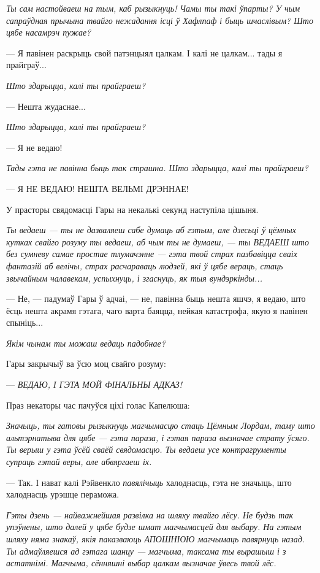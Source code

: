 \emph{Ты сам настойваеш на тым, каб рызыкнуць! Чамы ты такі ўпарты? У чым 
сапраўдная прычына твайго нежадання ісці ў Хафлпаф і быць шчаслівым? Што цябе 
насамрэч пужае?}

--- Я павінен раскрыць свой патэнцыял цалкам. І калі не цалкам... тады 
я прайграў...

\emph{Што здарыцца, калі ты прайграеш?}

--- Нешта жудаснае...

\emph{Што здарыцца, калі ты прайграеш?}

--- Я не ведаю!

\emph{Тады гэта не павінна быць так страшна. Што здарыцца, калі ты прайграеш?}

--- Я НЕ ВЕДАЮ! НЕШТА ВЕЛЬМІ ДРЭННАЕ!

У прасторы свядомасці Гары на некалькі секунд наступіла цішыня. 

\emph{Ты ведаеш --- ты не дазваляеш сабе думаць аб гэтым, але дзесьці ў цёмных 
кутках свайго розуму ты ведаеш, аб чым ты не думаеш, --- ты ВЕДАЕШ што без сумневу
самае простае тлумачэнне --- гэта твой страх пазбавіцца сваіх фантазій аб велічы, 
страх расчараваць людзей, які ў цябе вераць, стаць звычайным чалавекам, успыхнуць,
і згаснуць, як тыя вундэркінды...}

---  Не, --- падумаў Гары ў адчаі, --- не,
павінна быць нешта яшчэ, я ведаю, што ёсць нешта акрамя гэтага, чаго варта баяцца,
нейкая катастрофа, якую я павінен спыніць...

\emph{Якім чынам ты можаш ведаць падобнае?}

Гары закрычыў ва ўсю моц свайго розуму:

--- \emph{ВЕДАЮ, І ГЭТА МОЙ ФІНАЛЬНЫ АДКАЗ!}

Праз некаторы час пачуўся ціхі голас Капелюша:

\emph{Значыць, ты гатовы рызыкнуць магчымасцю стаць Цёмным Лордам, таму што
альтэрнатыва для цябе --- гэта параза, і гэтая параза вызначае страту ўсяго. Ты 
верыш у гэта ўсёй сваёй свядомасцю. Ты ведаеш усе контрагрументы супраць 
гэтай веры, але абвяргаеш іх.}

--- Так. І нават калі Рэйвенкло \emph{павялічыць} халоднасць, гэта не значыць, што
халоднасць урэшце пераможа.

\emph{Гэты дзень --- найважнейшая развілка на шляху твайго лёсу. Не будзь 
так упэўнены, што далей у цябе будзе шмат магчымасцей для выбару.
На гэтым шляху няма знакаў, якія паказваюць АПОШНЮЮ магчымаць павярнуць назад. 
Ты адмаўляешся ад гэтага шанцу --- магчыма, таксама ты вырашыш і з астатнімі.
Магчыма, сённяшні выбар цалкам вызначае ўвесь твой лёс.}

